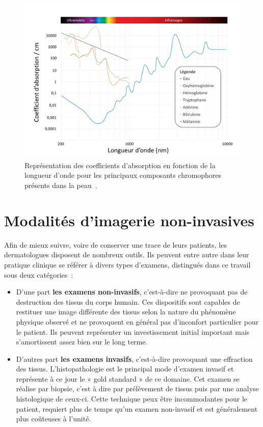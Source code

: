 \begin{figure}[H]
    \centering
    \includegraphics[width=\linewidth]{contents/chapter_2/resources/scheme_light_absorption.pdf}
    \caption{Représentation des coefficients d'absorption en fonction de la longueur d'onde pour les principaux composants chromophores présents dans la peau~\cite{Raulin2013}.}
    \label{fig:scheme_light_absorption}
\end{figure}
 
\clearpage

\section{Modalités d’imagerie non-invasives}
Afin de mieux suivre, voire de conserver une trace de leurs patients, les dermatologues disposent de nombreux outils. Ils peuvent entre autre dans leur pratique clinique se référer à divers types d’examens, distingués dans ce travail sous deux catégories~:
\begin{itemize}
    \item D’une part \textbf{les examens non-invasifs}, c’est-à-dire ne provoquant pas de destruction des tissus du corps humain. Ces dispositifs sont capables de restituer une image différente des tissus selon la nature du phénomène physique observé et ne provoquent en général pas d’inconfort particulier pour le patient. Ils peuvent représenter un investissement initial important mais s'amortissent assez bien sur le long terme. 
    \item D’autres part \textbf{les examens invasifs}, c’est-à-dire provoquant une effraction des tissus. L'histopathologie est le principal mode d'examen invasif et représente à ce jour le « gold standard » de ce domaine. Cet examen se réalise par biopsie, c'est à dire par prélèvement de tissus puis par une analyse histologique de ceux-ci. Cette technique peux être incommodantes pour le patient, requiert plus de temps qu'un examen non-invasif et est généralement plus coûteuses à l'unité.
\end{itemize}\par

